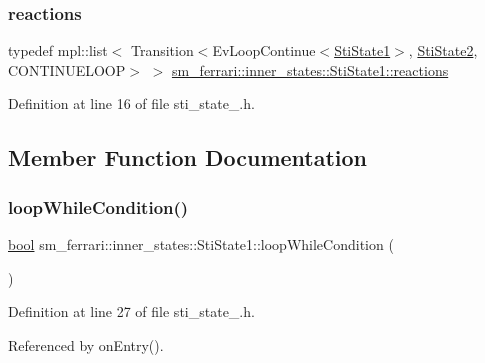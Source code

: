 \subsubsection{\texorpdfstring{reactions}{reactions}}
{\footnotesize\ttfamily typedef mpl\+::list$<$ Transition$<$Ev\+Loop\+Continue$<$\hyperlink{structsm__ferrari_1_1inner__states_1_1StiState1}{Sti\+State1}$>$, \hyperlink{structsm__ferrari_1_1inner__states_1_1StiState2}{Sti\+State2}, C\+O\+N\+T\+I\+N\+U\+E\+L\+O\+OP$>$ $>$ \hyperlink{structsm__ferrari_1_1inner__states_1_1StiState1_aa7e9f074031e748f9f1a66a45399cc10}{sm\+\_\+ferrari\+::inner\+\_\+states\+::\+Sti\+State1\+::reactions}}



Definition at line 16 of file sti\+\_\+state\+\_.\+h.



\subsection{Member Function Documentation}
\mbox{\label{structsm__ferrari_1_1inner__states_1_1StiState1_a6ffaddc2045557b0382fdcfde4628a08}} 
\subsubsection{\texorpdfstring{loop\+While\+Condition()}{loopWhileCondition()}}
{\footnotesize\ttfamily \hyperlink{classbool}{bool} sm\+\_\+ferrari\+::inner\+\_\+states\+::\+Sti\+State1\+::loop\+While\+Condition (\begin{DoxyParamCaption}{ }\end{DoxyParamCaption})\hspace{0.3cm}{\ttfamily [inline]}}



Definition at line 27 of file sti\+\_\+state\+\_.\+h.



Referenced by on\+Entry().


